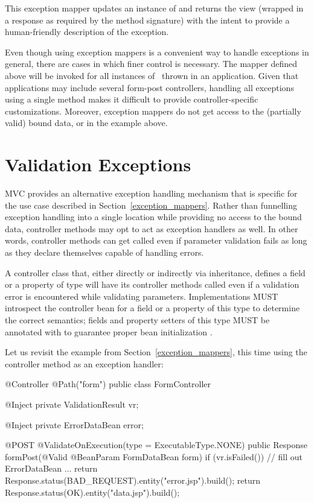 This exception mapper updates an instance of  and returns 
the  view 
(wrapped in a response as required by the method signature) with the intent to provide a 
human-friendly description of the exception.

Even though using exception mappers is a convenient way to handle exceptions in general, 
there are cases in which finer control is necessary. The mapper defined above will be
invoked for all instances of \ConstVioExc\ thrown in an application. Given that 
applications may include several form-post controllers, handling all exceptions using
a single method makes it difficult to provide controller-specific customizations.
Moreover, exception mappers do not get access to the (partially valid) bound
data, or  in the example above.

\section{Validation Exceptions}
\label{validation_exceptions}

MVC provides an alternative exception handling mechanism that is specific for the 
use case described in Section~\ref{exception_mappers}. Rather than funnelling 
exception handling into a single location while providing no access to the bound
data, controller methods may opt to act as exception handlers as well. In other words, 
controller methods can get called even if parameter validation fails as long as
they declare themselves capable of handling errors.

A controller class that, either directly or indirectly via inheritance, defines 
a field or a property of type 
 will have its controller methods
called even if a validation error is encountered while validating parameters. 
Implementations MUST introspect the controller bean for a field or a property of
this type to determine the correct semantics; fields and property setters
of this type MUST be annotated with  to guarantee proper bean
initialization .

Let us revisit the example from Section~\ref{exception_mappers},
this time using the controller method as an exception handler:

\begin{listing}{1}
@Controller
@Path("form")
public class FormController {

    @Inject
    private ValidationResult vr;
    
    @Inject
    private ErrorDataBean error;

    @POST
    @ValidateOnExecution(type = ExecutableType.NONE)
    public Response formPost(@Valid @BeanParam FormDataBean form) {
        if (vr.isFailed()) {
            // fill out ErrorDataBean ...
            return Response.status(BAD_REQUEST).entity("error.jsp").build();
        }
        return Response.status(OK).entity("data.jsp").build();    
    }
}
\end{listing}

